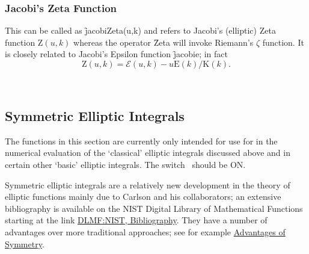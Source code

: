 \subsubsection{Jacobi's Zeta Function}
\hypertarget{operator:JACOBIZETA}{}

This can be called as \f{jacobiZeta(u,k)} and refers to Jacobi's (elliptic)
Zeta function $\mathrm{Z}(u,k)$ whereas the operator \f{Zeta} will invoke
Riemann's $\zeta$ function. It is closely related to Jacobi's Epsilon function
\f{jacobie}; in fact
\[\mathrm{Z}(u,k) = \mathcal{E}(u,k)-u\mathrm{E}(k)/\mathrm{K}(k).\]

\
\subsection{Symmetric Elliptic Integrals}
The functions in this section are currently only intended for use for in the
numerical evaluation of the `classical' elliptic integrals discussed above and
in certain other `basic' elliptic integrals. The switch \sw{rounded}\ should be
ON.

Symmetric elliptic integrals are a relatively new development in the theory of
elliptic functions mainly due to Carlson and his collaborators; an extensive
bibliography is available on the NIST Digital Library of Mathematical Functions
starting at the link \href{https://dlmf.nist.gov/bib/C#bib449}
{DLMF:NIST, Bibliography}. They have a number of advantages over more
traditional approaches; see for example
\href{https://dlmf.nist.gov/19.15}{Advantages of Symmetry}.

